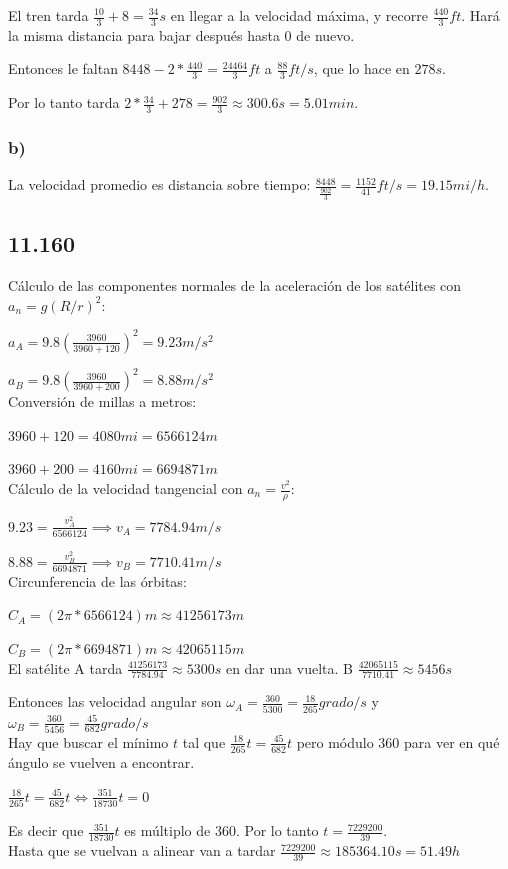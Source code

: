 \documentclass[12pt]{article}
\begin{document}
El tren tarda $\frac{10}{3}+8=\frac{34}{3}s$ en llegar a la velocidad máxima, y recorre $\frac{440}{3}ft$. Hará la misma distancia para bajar después hasta 0 de nuevo.

Entonces le faltan $8448-2*\frac{440}{3}=\frac{24464}{3}ft$ a $\frac{88}{3}ft/s$, que lo hace en $278s$.

Por lo tanto tarda $2*\frac{34}{3}+278=\frac{902}{3}\approx 300.6s=5.01min$.
\subsubsection*{b)}
La velocidad promedio es distancia sobre tiempo: $\frac{8448}{\frac{902}{3}}=\frac{1152}{41}ft/s=19.15mi/h$.
\newpage
\subsection*{11.160}
Cálculo de las componentes normales de la aceleración de los satélites con $a_n=g(R/r)^2$:

$a_A=9.8(\frac{3960}{3960+120})^2=9.23m/s^2$

$a_B=9.8(\frac{3960}{3960+200})^2=8.88m/s^2$\\

Conversión de millas a metros:

$3960+120=4080mi=6566124m$

$3960+200=4160mi=6694871m$\\

Cálculo de la velocidad tangencial con $a_n=\frac{v^2}{\rho}$:

$9.23=\frac{v_A^2}{6566124}\implies v_A=7784.94m/s$

$8.88=\frac{v_B^2}{6694871}\implies v_B=7710.41m/s$\\

Circunferencia de las órbitas:

$C_A=(2\pi*6566124)m\approx 41256173m$

$C_B=(2\pi*6694871)m\approx 42065115m$\\

El satélite A tarda $\frac{41256173}{7784.94}\approx 5300s$ en dar una vuelta. B $\frac{42065115}{7710.41}\approx 5456s$

Entonces las velocidad angular son $\omega_A=\frac{360}{5300}=\frac{18}{265} grado/s$ y $\omega_B=\frac{360}{5456}=\frac{45}{682} grado/s$\\

Hay que buscar el mínimo $t$ tal que $\frac{18}{265}t=\frac{45}{682}t$ pero módulo 360 para ver en qué ángulo se vuelven a encontrar.

$\frac{18}{265}t=\frac{45}{682}t\iff\frac{351}{18730}t=0$

Es decir que $\frac{351}{18730}t$ es múltiplo de 360. Por lo tanto $t=\frac{7229200}{39}$.\\

Hasta que se vuelvan a alinear van a tardar $\frac{7229200}{39}\approx 185364.10s=51.49h$
\end{document}
